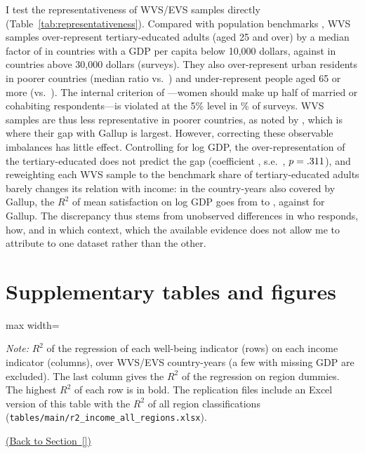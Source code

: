 \documentclass[11pt]{article}
\providecommand{\backlink}[2]{\if\relax\detokenize{#2}\relax\else\hfill\hyperref[#2]{(Back to Section~\ref*{#2})}\fi}
\begin{document}
I test the representativeness of WVS/EVS samples directly (Table~\ref{tab:representativeness}). Compared with population benchmarks \citep{barro_new_2013,worldbank_wdi_2026}, WVS samples over-represent tertiary-educated adults (aged 25 and over) by a median factor of \ratioTertiaryLow in countries with a GDP per capita below 10,000 dollars, against \ratioTertiaryHigh in countries above 30,000 dollars (\nCompositionSurveys surveys). They also over-represent urban residents in poorer countries (median ratio \ratioUrbanLow vs.\ \ratioUrbanHigh) and under-represent people aged 65 or more (\ratioOldLow vs.\ \ratioOldHigh). The internal criterion of \citet{kohler_surveys_2007}---women should make up half of married or cohabiting respondents---is violated at the 5\% level in \shareGenderFlag\% of surveys. WVS samples are thus less representative in poorer countries, as noted by \citet{deaton_income_2008}, which is where their gap with Gallup is largest. However, correcting these observable imbalances has little effect. Controlling for log GDP, the over-representation of the tertiary-educated does not predict the gap (coefficient \coefTertiaryGap, s.e.\ \seTertiaryGap, $p = .311$), and reweighting each WVS sample to the benchmark share of tertiary-educated adults barely changes its relation with income: in the country-years also covered by Gallup, the $R^2$ of mean satisfaction on log GDP goes from \RtwoCommonWVSraw to \RtwoCommonWVSeduAdj, against \RtwoCommonGallupSub for Gallup. The discrepancy thus stems from unobserved differences in who responds, how, and in which context, which the available evidence does not allow me to attribute to one dataset rather than the other.

\clearpage
\section{Supplementary tables and figures}\label{sec:si_tables}

\begin{table}[p]
    \centering
    \caption{Share of the variance of national well-being explained by income alone ($R^2$), WVS/EVS 1981--2023.}\label{tab:r2_income}
    \begin{adjustbox}{max width=\textwidth}
    
    \end{adjustbox}
    \begin{minipage}{\textwidth}\footnotesize \textit{Note:} $R^2$ of the regression of each well-being indicator (rows) on each income indicator (columns), over \nWVSCountryYears WVS/EVS country-years (a few with missing GDP are excluded). The last column gives the $R^2$ of the regression on region dummies. The highest $R^2$ of each row is in bold. The replication files include an Excel version of this table with the $R^2$ of all region classifications (\texttt{tables/main/r2\_income\_all\_regions.xlsx}).\end{minipage}
    {\footnotesize\backlink{tab:r2_income}{}\par}
\end{table}
\end{document}
